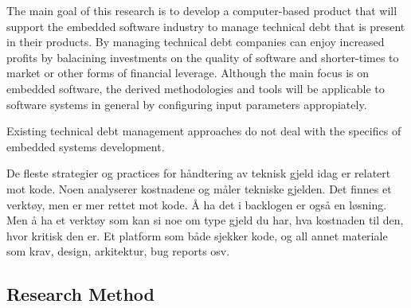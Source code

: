 

The main goal of this research is to develop a computer-based product that will support the embedded software industry to manage technical debt that is present in their products. By managing technical debt companies can enjoy increased profits by balacining investments on the quality of software and shorter-times to market or other forms of financial leverage. Although the main focus is on embedded software, the derived methodologies and tools will be applicable to software systems in general by configuring input parameters appropiately. 

Existing technical debt management approaches do not deal with the specifics of embedded systems development. 

De fleste strategier og practices for håndtering av teknisk gjeld idag er relatert mot kode. Noen analyserer kostnadene og måler tekniske gjelden. Det finnes et verktøy, men er mer rettet mot kode. Å ha det i backlogen er også en løsning. Men å ha et verktøy som kan si noe om type gjeld du har, hva kostnaden til den, hvor kritisk den er. Et platform som både sjekker kode, og all annet materiale som krav, design, arkitektur, bug reports osv.


\subsection*{Research Method}


